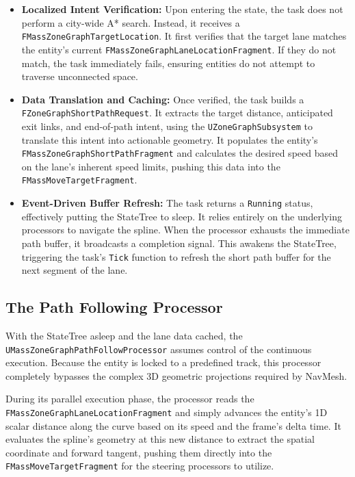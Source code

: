 \begin{itemize}
\item \textbf{Localized Intent Verification:} Upon entering the state, the task does not perform a city-wide A* search. Instead, it receives a \newline\texttt{FMassZoneGraphTargetLocation}. It first verifies that the target lane matches the entity's current \texttt{FMassZoneGraphLaneLocationFragment}. If they do not match, the task immediately fails, ensuring entities do not attempt to traverse unconnected space.
\item \textbf{Data Translation and Caching:} Once verified, the task builds a \newline\texttt{FZoneGraphShortPathRequest}. It extracts the target distance, anticipated exit links, and end-of-path intent, using the \texttt{UZoneGraphSubsystem} to translate this intent into actionable geometry. It populates the entity's \newline\texttt{FMassZoneGraphShortPathFragment} and calculates the desired speed based on the lane's inherent speed limits, pushing this data into the \newline\texttt{FMassMoveTargetFragment}.
\item \textbf{Event-Driven Buffer Refresh:} The task returns a \texttt{Running} status, effectively putting the StateTree to sleep. It relies entirely on the underlying processors to navigate the spline. When the processor exhausts the immediate path buffer, it broadcasts a completion signal. This awakens the StateTree, triggering the task's \texttt{Tick} function to refresh the short path buffer for the next segment of the lane.
\end{itemize}

\subsection{The Path Following Processor}

With the StateTree asleep and the lane data cached, the \newline\texttt{UMassZoneGraphPathFollowProcessor} assumes control of the continuous execution. Because the entity is locked to a predefined track, this processor completely bypasses the complex 3D geometric projections required by NavMesh.

During its parallel execution phase, the processor reads the \newline\texttt{FMassZoneGraphLaneLocationFragment} and simply advances the entity's 1D scalar distance along the curve based on its speed and the frame's delta time. It evaluates the spline's geometry at this new distance to extract the spatial coordinate and forward tangent, pushing them directly into the \texttt{FMassMoveTargetFragment} for the steering processors to utilize.

